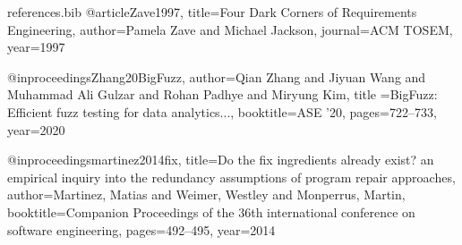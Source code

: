 \documentclass[pdflatex,sn-basic]{sn-jnl}
\begin{document}
\begin{filecontents}{references.bib}
@article{Zave1997,
  title={Four Dark Corners of Requirements Engineering},
  author={Pamela Zave and Michael Jackson}, journal={ACM TOSEM}, year={1997}
}

@inproceedings{Zhang20BigFuzz,
  author={Qian Zhang and Jiyuan Wang and Muhammad Ali Gulzar and Rohan Padhye and Miryung Kim},
  title ={BigFuzz: Efficient fuzz testing for data analytics...},
  booktitle={ASE '20}, pages={722--733}, year={2020}
}


@inproceedings{martinez2014fix,
  title={Do the fix ingredients already exist? an empirical inquiry into the redundancy assumptions of program repair approaches},
  author={Martinez, Matias and Weimer, Westley and Monperrus, Martin},
  booktitle={Companion Proceedings of the 36th international conference on software engineering},
  pages={492--495},
  year={2014}
}

\end{filecontents}


\end{document}
